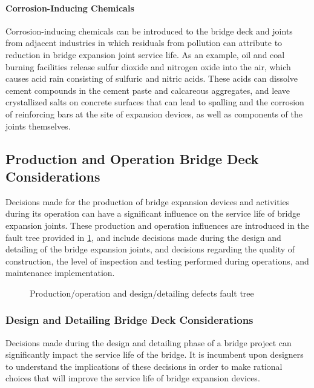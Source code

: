 \paragraph*{Corrosion-Inducing Chemicals}
Corrosion-inducing chemicals can be introduced to the bridge deck and joints from adjacent industries in which residuals from pollution can attribute to reduction in bridge expansion joint service life. As an example, oil and coal burning facilities release sulfur dioxide and nitrogen oxide into the air, which causes acid rain consisting of sulfuric and nitric acids. These acids can dissolve cement compounds in the cement paste and calcareous aggregates, and leave crystallized salts on concrete surfaces that can lead to spalling and the corrosion of reinforcing bars at the site of expansion devices, as well as components of the joints themselves.

\subsection{Production and Operation Bridge Deck Considerations}
Decisions made for the production of bridge expansion devices and activities during its operation can have a significant influence on the service life of bridge expansion joints. These production and operation influences are introduced in the fault tree provided in \cref{fig:faulttree-expansion-joint-operation}, and include decisions made during the design and detailing of the bridge expansion joints, and decisions regarding the quality of construction, the level of inspection and testing performed during operations, and maintenance implementation.

\begin{figure}
  \caption{Production/operation and design/detailing defects fault tree}
  \label{fig:faulttree-expansion-joint-operation}
\end{figure}

\subsubsection{Design and Detailing Bridge Deck Considerations}
Decisions made during the design and detailing phase of a bridge project can significantly impact the service life of the bridge. It is incumbent upon designers to understand the implications of these decisions in order to make rational choices that will improve the service life of bridge expansion devices.

